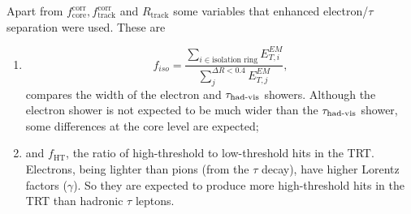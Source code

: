 \par Apart from $f_{\text{core}}^{\text{corr}}, f_{\text{track}}^{\text{corr}}$ and $R_{\text{track}}$
 some variables that enhanced electron/$\tau$ separation were used. These are 
\begin{enumerate}
\item 
\begin{equation*}
f_{iso} = \frac{\sum_{i\in\text{isolation ring}}E_{T,i}^{EM}}{\sum_{j}^{\Delta R<0.4} E_{T,j}^{EM}},
\end{equation*}
compares the width of the electron and $\tau_{\text{had-vis}}$ showers. Although the electron shower is not expected 
to be much wider than the $\tau_{\text{had-vis}}$ shower, some differences at the core level are expected;

\item and $f_{\text{HT}}$, the ratio of high-threshold to low-threshold hits in the TRT. Electrons, being 
lighter than pions (from the $\tau$ decay), have higher Lorentz factors ($\gamma$). So they are 
expected to produce more high-threshold hits in the TRT than hadronic $\tau$ leptons.  
\end{enumerate} 

%
%
%



